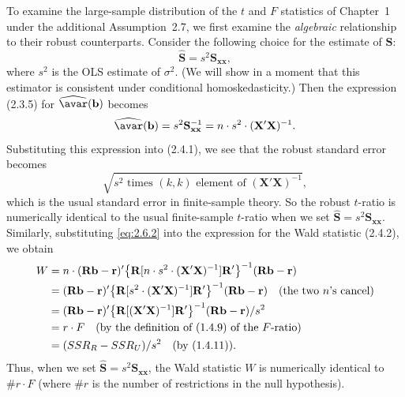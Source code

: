 To examine the large-sample distribution of the $t$ and $F$ statistics of Chapter~1
under the additional Assumption~2.7, we first examine the \emph{algebraic} relationship
to their robust counterparts.  Consider the following choice for the estimate of
$\mathbf{S}$:
\[
  \widehat{\mathbf{S}} = s^2 \mathbf{S}_{\mathbf{xx}},
\]
where $s^2$ is the OLS estimate of $\sigma^2$.  (We will show in a moment that this
estimator is consistent under conditional homoskedasticity.)  Then the expression (2.3.5)
for $\widehat{\avar}(\mathbf{b})$ becomes
\begin{equation}
  \widehat{\avar}(\mathbf{b}) = s^2 \mathbf{S}_{\mathbf{xx}}^{-1}
    = n \cdot s^2 \cdot (\mathbf{X}'\mathbf{X})^{-1}.
  \label{eq:2.6.2}
\end{equation}
Substituting this expression into (2.4.1), we see that the robust standard error becomes
\begin{equation}
  \sqrt{s^2 \text{ times } (k,k) \text{ element of } (\mathbf{X}'\mathbf{X})^{-1}},
  \label{eq:2.6.3}
\end{equation}
which is the usual standard error in finite-sample theory.  So the robust $t$-ratio is
numerically identical to the usual finite-sample $t$-ratio when we set
$\widehat{\mathbf{S}} = s^2 \mathbf{S}_{\mathbf{xx}}$.  Similarly, substituting
\eqref{eq:2.6.2} into the expression for the Wald statistic (2.4.2), we obtain
\begin{align}
  W &= n \cdot (\mathbf{R}\mathbf{b} - \mathbf{r})'
    \bigl\{\mathbf{R}[n \cdot s^2 \cdot (\mathbf{X}'\mathbf{X})^{-1}]\mathbf{R}'
    \bigr\}^{-1} (\mathbf{R}\mathbf{b} - \mathbf{r}) \notag \\
    &= (\mathbf{R}\mathbf{b} - \mathbf{r})'
    \bigl\{\mathbf{R}[s^2 \cdot (\mathbf{X}'\mathbf{X})^{-1}]\mathbf{R}'
    \bigr\}^{-1} (\mathbf{R}\mathbf{b} - \mathbf{r})
    \quad (\text{the two } n\text{'s cancel}) \notag \\
    &= (\mathbf{R}\mathbf{b} - \mathbf{r})'
    \bigl\{\mathbf{R}[(\mathbf{X}'\mathbf{X})^{-1}]\mathbf{R}'
    \bigr\}^{-1} (\mathbf{R}\mathbf{b} - \mathbf{r}) / s^2 \notag \\
    &= r \cdot F \quad (\text{by the definition of (1.4.9) of the } F\text{-ratio})
      \notag \\
    &= (SSR_R - SSR_U)/s^2 \quad (\text{by (1.4.11)}).
\end{align}
Thus, when we set $\widehat{\mathbf{S}} = s^2 \mathbf{S}_{\mathbf{xx}}$, the Wald
statistic $W$ is numerically identical to $\#r \cdot F$ (where $\#r$ is the number of
restrictions in the null hypothesis).

